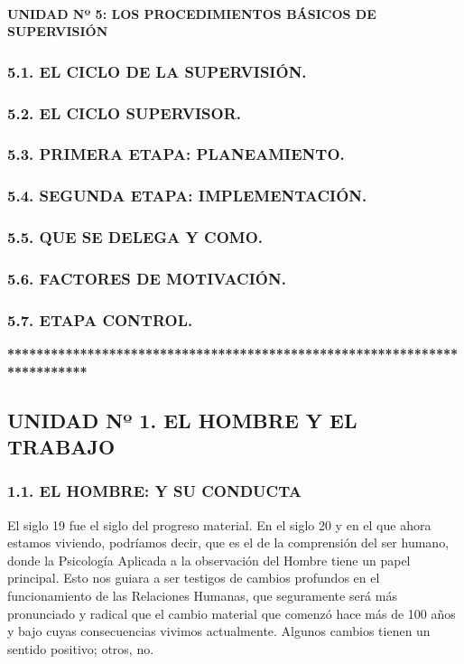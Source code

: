 \paragraph*{UNIDAD Nº 5: LOS PROCEDIMIENTOS BÁSICOS DE SUPERVISIÓN}
\subsubsection*{5.1. EL CICLO DE LA SUPERVISIÓN.}
\subsubsection*{5.2. EL CICLO SUPERVISOR.}
\subsubsection*{5.3. PRIMERA ETAPA: PLANEAMIENTO.}
\subsubsection*{5.4. SEGUNDA ETAPA: IMPLEMENTACIÓN.}
\subsubsection*{5.5. QUE SE DELEGA Y COMO.}
\subsubsection*{5.6. FACTORES DE MOTIVACIÓN.}
\subsubsection*{5.7. ETAPA CONTROL.}
\textbf{*************************************************************************}



\subsection*{UNIDAD Nº 1. EL HOMBRE Y EL TRABAJO}
\subsubsection*{1.1. EL HOMBRE: Y SU CONDUCTA}
El siglo 19 fue el siglo del progreso material. En el siglo 20 y en el que ahora estamos viviendo, podríamos decir, que es el de la comprensión del ser humano, donde la Psicología Aplicada a la observación del Hombre tiene un papel principal. Esto nos guiara a ser testigos de cambios profundos en el funcionamiento de las Relaciones Humanas, que seguramente será más pronunciado y radical que el cambio material que comenzó hace más de 100 años y bajo cuyas consecuencias vivimos actualmente. Algunos cambios tienen un sentido positivo; otros, no.

